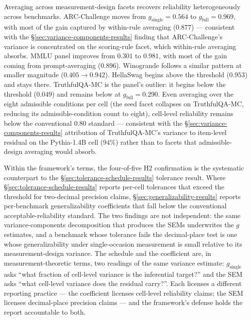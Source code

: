 \documentclass[11pt]{article}
\begin{document}
Averaging across measurement-design facets recovers reliability heterogeneously across benchmarks. ARC-Challenge moves from $g_{\mathrm{single}} = 0.564$ to $g_{\mathrm{full}} = 0.969$, with most of the gain captured by within-rule averaging ($0.877$) --- consistent with the §\ref{sec:variance-components-results} finding that ARC-Challenge's variance is concentrated on the scoring-rule facet, which within-rule averaging absorbs. MMLU panel improves from $0.301$ to $0.981$, with most of the gain coming from prompt-averaging ($0.896$). Winogrande follows a similar pattern at smaller magnitude ($0.405 \to 0.942$). HellaSwag begins above the threshold ($0.953$) and stays there. TruthfulQA-MC is the panel's outlier: it begins below the threshold ($0.049$) and remains below at $g_{\mathrm{full}} = 0.290$. Even averaging over the eight admissible conditions per cell (the seed facet collapses on TruthfulQA-MC, reducing its admissible-condition count to eight), cell-level reliability remains below the conventional $0.80$ standard --- consistent with the §\ref{sec:variance-components-results} attribution of TruthfulQA-MC's variance to item-level residual on the Pythia-1.4B cell ($94\%$) rather than to facets that admissible-design averaging would absorb.

Within the framework's terms, the four-of-five H2 confirmation is the systematic counterpart to the §\ref{sec:tolerance-schedule-results} tolerance result. Where §\ref{sec:tolerance-schedule-results} reports per-cell tolerances that exceed the threshold for two-decimal precision claims, §\ref{sec:generalizability-results} reports per-benchmark generalizability coefficients that fall below the conventional acceptable-reliability standard. The two findings are not independent: the same variance-components decomposition that produces the SEMs underwrites the $g$ estimates, and a benchmark whose tolerance fails the decimal-place test is one whose generalizability under single-occasion measurement is small relative to its measurement-design variance. The schedule and the coefficient are, in measurement-theoretic terms, two readings of the same variance estimate: $g_{\mathrm{single}}$ asks ``what fraction of cell-level variance is the inferential target?'' and the SEM asks ``what cell-level variance does the residual carry?''. Each licenses a different reporting practice --- the coefficient licenses cell-level reliability claims; the SEM licenses decimal-place precision claims --- and the framework's defense holds the report accountable to both.
\end{document}
